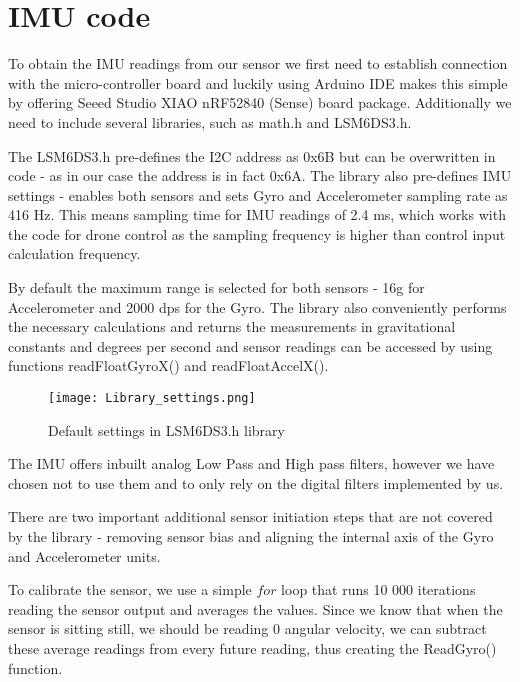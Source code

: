 \section{IMU code}

\begin{flushleft}
To obtain the IMU readings from our sensor we first need to establish connection with the micro-controller board and luckily using Arduino IDE makes this simple by offering Seeed Studio XIAO nRF52840 (Sense) board package. Additionally we need to include several libraries, such as math.h and LSM6DS3.h. 

The LSM6DS3.h pre-defines the I2C address as 0x6B but can be overwritten in code - as in our case the address is in fact 0x6A. 
The library also pre-defines IMU settings - enables both sensors and sets Gyro and Accelerometer sampling rate as 416 Hz. This means sampling time for IMU readings of 2.4 ms, which works with the code for drone control as the sampling frequency is higher than control input calculation frequency. 

By default the maximum range is selected for both sensors - 16g for Accelerometer and 2000 dps for the Gyro. The library also conveniently performs the necessary calculations and returns the measurements in gravitational constants and degrees per second and sensor readings can be accessed by using functions readFloatGyroX() and readFloatAccelX().  

\begin{figure}[H]
    \begin{center}
    \texttt{[image: Library\_settings.png]}
    \end{center}
    \caption{Default settings in LSM6DS3.h library}
    \label{fig:my_label}
\end{figure}

\begin{flushleft}
The IMU offers inbuilt analog Low Pass and High pass filters, however we have chosen not to use them and to only rely on the digital filters implemented by us.

There are two important additional sensor initiation steps that are not covered by the library - removing sensor bias and aligning the internal axis of the Gyro and Accelerometer units. 

To calibrate the sensor, we use a simple $for$ loop that runs 10 000 iterations reading the sensor output and averages the values. Since we know that when the sensor is sitting still, we should be reading 0 angular velocity, we can subtract these average readings from every future reading, thus creating the ReadGyro() function. 
\end{flushleft}


\end{flushleft}
